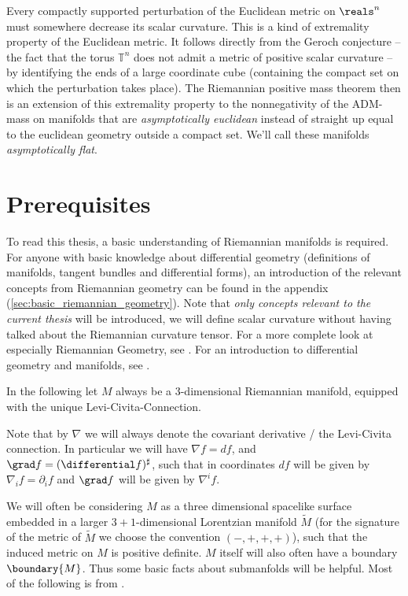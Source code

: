 \documentclass[titlepage,numbers=noenddot,headinclude,oneside,%
footinclude=true,cleardoublepage=empty,%
BCOR=5mm,paper=a4,fontsize=11pt,%
english,%
]{scrartcl}
\begin{document}
Every compactly supported perturbation of the Euclidean metric on \( \reals^n \) must somewhere decrease its scalar curvature. This is a kind of extremality property of the Euclidean metric. It follows directly from the Geroch conjecture -- the fact that the torus \( \mathbb{T}^n \) does not admit a metric of positive scalar curvature -- by identifying the ends of a large coordinate cube (containing the compact set on which the perturbation takes place). The Riemannian positive mass theorem then is an extension of this extremality property to the nonnegativity of the ADM-mass on manifolds that are \emph{asymptotically euclidean} instead of straight up equal to the euclidean geometry outside a compact set. We'll call these manifolds \emph{asymptotically flat}.

\section{Prerequisites}
To read this thesis, a basic understanding of Riemannian manifolds is required. For anyone with basic knowledge about differential geometry (definitions of manifolds, tangent bundles and differential forms), an introduction of the relevant concepts from Riemannian geometry can be found in the appendix (\cref{sec:basic_riemannian_geometry}). Note that \emph{only concepts relevant to the current thesis} will  be introduced, \eg we will define scalar curvature without having talked about the Riemannian curvature tensor. For a more complete look at especially Riemannian Geometry, see \cite[Chapters 1 and 2]{petersenRiemannianGeometry2006}. For an introduction to differential geometry and manifolds, see \cite{leeIntroductionSmoothManifolds2012}.

In the following let \( M \) always be a 3-dimensional Riemannian manifold, equipped with the unique Levi-Civita-Connection.

Note that by \( \nabla \) we will always denote the covariant derivative / the Levi-Civita connection. In particular we will have \( \nabla f=df \), and \( \grad f=(\differential f)^\sharp \), such that in coordinates \( df \) will be given by \( \nabla_i f=\partial_i f \) and \( \grad f \) will be given by \( \nabla^i     f \).

We will often be considering \( M \) as a three dimensional spacelike surface embedded in a larger \( 3+1 \)-dimensional Lorentzian manifold \( \tilde{M} \) (for the signature of the metric of \( \tilde{M} \) we choose the convention \( (-,+,+,+) \)), such that the induced metric on \( M \) is positive definite. \( M \) itself will also often have a boundary \( \boundary{M} \). Thus some basic facts about submanfolds will be helpful. Most of the following is from \cite[Chapter~2.1]{leeGeometricRelativity2019}.
\end{document}
